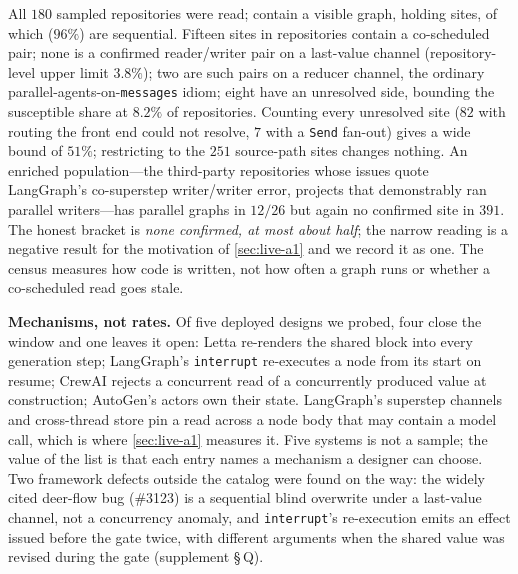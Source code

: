 All $180$ sampled repositories were read; \CensusRepos{} contain a visible
graph, holding \CensusSites{} sites, of which \CensusSequential{} ($96\%$)
are sequential. Fifteen sites in \CensusParallelRepos{} repositories contain
a co-scheduled pair; none is a confirmed reader/writer pair on a last-value
channel (repository-level upper limit $3.8\%$); two are such pairs on a
reducer channel, the ordinary parallel-agents-on-\texttt{messages} idiom;
eight have an unresolved side, bounding the susceptible share at $8.2\%$ of
repositories. Counting every unresolved site ($82$ with routing the front end
could not resolve, $7$ with a \texttt{Send} fan-out) gives a wide bound of
$51\%$; restricting to the $251$ source-path sites changes nothing. An
enriched population---the \CensusErrorStringRepos{} third-party repositories
whose issues quote LangGraph's co-superstep writer/writer error, projects that
demonstrably ran parallel writers---has parallel graphs in $12/26$ but again
no confirmed site in $391$. The honest bracket is \emph{none confirmed, at
most about half}; the narrow reading is a negative result for the motivation
of \cref{sec:live-a1} and we record it as one. The census measures how code
is written, not how often a graph runs or whether a co-scheduled read goes
stale.

\smallskip\noindent\textbf{Mechanisms, not rates.} Of five deployed designs we
probed, four close the window and one leaves it open: Letta re-renders the
shared block into every generation step; LangGraph's \texttt{interrupt}
re-executes a node from its start on resume; CrewAI rejects a concurrent read
of a concurrently produced value at construction; AutoGen's actors own their
state. LangGraph's superstep channels and cross-thread store pin a read across
a node body that may contain a model call, which is where \cref{sec:live-a1}
measures it. Five systems is not a sample; the value of the list is that each
entry names a mechanism a designer can choose. Two framework defects outside
the catalog were found on the way: the widely cited deer-flow bug (\#3123) is
a sequential blind overwrite under a last-value channel, not a concurrency
anomaly, and \texttt{interrupt}'s re-execution emits an effect issued before
the gate twice, with different arguments when the shared value was revised
during the gate (supplement \S\,Q).

